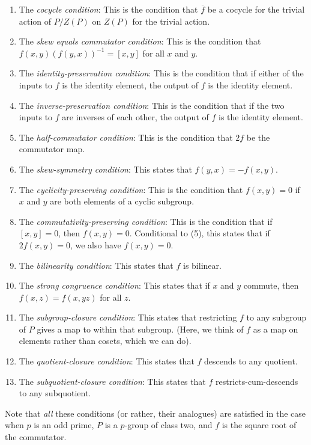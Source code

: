 \documentclass[10pt]{amsart}
\begin{document}
\begin{enumerate}
\item The {\em cocycle condition}: This is the condition that
  $\overline{f}$ be a cocycle for the trivial action of $P/Z(P)$ on
  $Z(P)$ for the trivial action.
\item The {\em skew equals commutator condition}: This is the
  condition that $f(x,y)(f(y,x))^{-1} = [x,y]$ for all $x$ and $y$.
\item The {\em identity-preservation condition}: This is the condition
  that if either of the inputs to $f$ is the identity element, the
  output of $f$ is the identity element.
\item The {\em inverse-preservation condition}: This is the condition
  that if the two inputs to $f$ are inverses of each other, the output
  of $f$ is the identity element.
\item The {\em half-commutator condition}: This is the condition that
  $2f$ be the commutator map.
\item The {\em skew-symmetry condition}: This states that $f(y,x) =
  -f(x,y)$.
\item The {\em cyclicity-preserving condition}: This is the condition
  that $f(x,y) = 0$ if $x$ and $y$ are both elements of a cyclic subgroup.
\item The {\em commutativity-preserving condition}: This is the
  condition that if $[x,y] = 0$, then $f(x,y) = 0$. Conditional to
  (5), this states that if $2f(x,y) = 0$, we also have $f(x,y) = 0$.
\item The {\em bilinearity condition}: This states that $f$ is
  bilinear.
\item The {\em strong congruence condition}: This states that if $x$
  and $y$ commute, then $f(x,z) = f(x,yz)$ for all $z$.
\item The {\em subgroup-closure condition}: This states that
  restricting $f$ to any subgroup of $P$ gives a map to within that
  subgroup. (Here, we think of $f$ as a map on elements rather than
  cosets, which we can do).
\item The {\em quotient-closure condition}: This states that $f$
  descends to any quotient.
\item The {\em subquotient-closure condition}: This states that $f$
  restricts-cum-descends to any subquotient.
\end{enumerate}

Note that {\em all} these conditions (or rather, their analogues) are
satisfied in the case when $p$ is an odd prime, $P$ is a $p$-group of
class two, and $f$ is the square root of the commutator.
\end{document}

